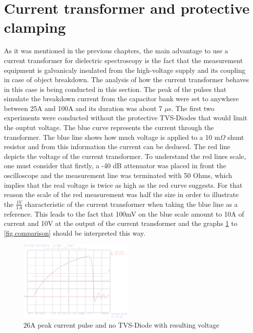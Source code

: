 \section{Current transformer and protective clamping} 
As it was mentioned in the previous chapters, the main advantage to use a current transformer for
dielectric spectroscopy is the fact that the measurement equipment is galvanicaly insulated from the high-voltage supply and its
coupling in case of object breakdown. The analysis of how the current transformer behaves in this case is being conducted in this section.
The peak of the pulses that simulate the breakdown current from the capacitor bank were set to anywhere between 25A and 100A and its duration was about 7 $\mu$s.
The first two experiments were conducted without the protective TVS-Diodes that would limit the ouptut voltage.
The blue curve represents the current through the transformer. The blue line shows how much voltage is applied to a 10 m$\Omega$ shunt resistor and from this information the current can
be deduced. The red line depicts the voltage of the current transformer. To understand the red lines scale, one must consider that firstly, a -40 dB attenuator was placed in front the
oscilloscope and the measurement line was terminated with 50 Ohms, which implies that the real voltage is twice as high as the red curve suggests. For that reason the scale of the red measurement was half the size in order to illustrate the
$\frac{1V}{1A}$ characteristic of the current transformer when taking the blue line as a reference.
\newline 
This leads to the fact that 100mV on the blue scale amount to 10A of current and 10V at the output of the current transformer and the graphs \ref{fig.26Anodiode} to \ref{fig.comparison} should be interpreted
this way.


\begin{figure}[!ht]
	\centering
	\includegraphics[width=0.5\textwidth]{figures/Voltage_Clamping/TEK00001.eps}		
	\caption[Kurze Abbildungsbeschreibung]{26A peak current pulse and no TVS-Diode with resulting voltage} 
	\label{fig.26Anodiode}
\end{figure}

